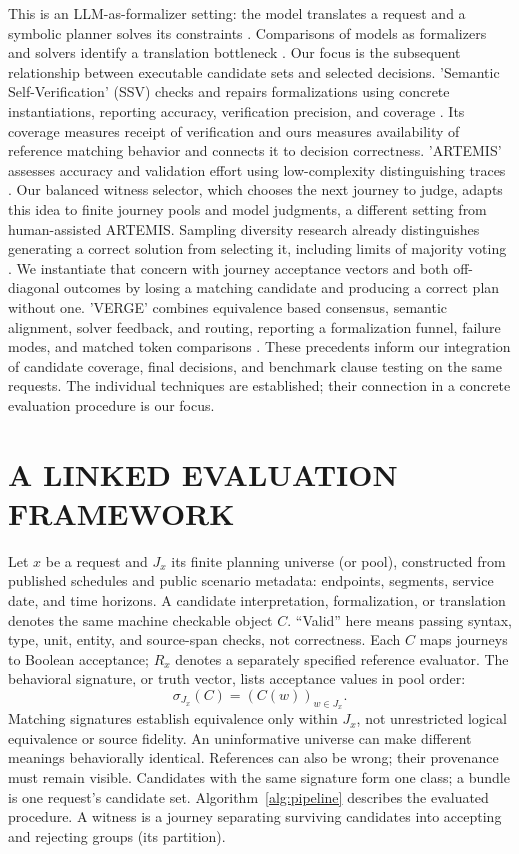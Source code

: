 \documentclass[a4paper,twoside]{article}
\begin{document}
This is an LLM-as-formalizer setting: the model translates a request and a symbolic planner solves its constraints \cite{tantakoun}. Comparisons of models as formalizers and solvers identify a translation bottleneck \cite{amonkar}. Our focus is the subsequent relationship between executable candidate sets and selected decisions.
'Semantic Self-Verification' (SSV) checks and repairs formalizations using concrete instantiations, reporting accuracy, verification precision, and coverage \cite{ssv}. Its coverage measures receipt of verification and ours measures availability of reference matching behavior and connects it to decision correctness.
'ARTEMIS' assesses accuracy and validation effort using low-complexity distinguishing traces \cite{artemis}. Our balanced witness selector, which chooses the next journey to judge, adapts this idea to finite journey pools and model judgments, a different setting from human-assisted ARTEMIS.
Sampling diversity research already distinguishes generating a correct solution from selecting it, including limits of majority voting \cite{diversity}. We instantiate that concern with journey acceptance vectors and both off-diagonal outcomes by losing a matching candidate and producing a correct plan without one.
'VERGE' combines equivalence based consensus, semantic alignment, solver feedback, and routing, reporting a formalization funnel, failure modes, and matched token comparisons \cite{verge}. These precedents inform our integration of candidate coverage, final decisions, and benchmark clause testing on the same requests. The individual techniques are established; their connection in a concrete evaluation procedure is our focus.



\section{\uppercase{A Linked Evaluation Framework}}
\label{sec:framework}

\noindent Let $x$ be a request and $J_x$ its finite planning universe (or pool), constructed from published schedules and public scenario metadata: endpoints, segments, service date, and time horizons. A candidate interpretation, formalization, or translation denotes the same machine checkable object $C$. ``Valid'' here means passing syntax, type, unit, entity, and source-span checks, not correctness. Each $C$ maps journeys to Boolean acceptance; $R_x$ denotes a separately specified reference evaluator. The behavioral signature, or truth vector, lists acceptance values in pool order:
\begin{equation}
  \sigma_{J_x}(C)=(C(w))_{w\in J_x}.
\end{equation}
Matching signatures establish equivalence only within $J_x$, not unrestricted logical equivalence or source fidelity. An uninformative universe can make different meanings behaviorally identical. References can also be wrong; their provenance must remain visible.
Candidates with the same signature form one class; a bundle is one request's candidate set. Algorithm~\ref{alg:pipeline} describes the evaluated procedure. A witness is a journey separating surviving candidates into accepting and rejecting groups (its partition).
\end{document}
